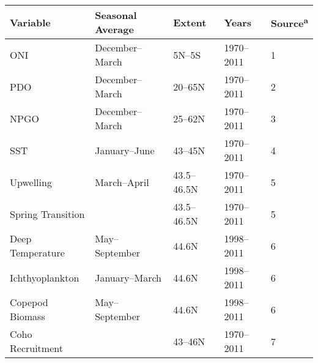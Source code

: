 \begin{tabular}{lllll}
  \hline
Variable & Seasonal Average & Extent & Years & Source\textsuperscript{a} \\ 
  \hline
ONI & December--March & 5N--5S & 1970--2011 & 1 \\ 
  PDO & December--March & 20--65N & 1970--2011 & 2 \\ 
  NPGO & December--March & 25--62N & 1970--2011 & 3 \\ 
  SST & January--June & 43--45N & 1970--2011 & 4 \\ 
  Upwelling & March--April & 43.5--46.5N & 1970--2011 & 5 \\ 
  Spring Transition &  & 43.5--46.5N & 1970--2011 & 5 \\ 
  Deep Temperature & May--September & 44.6N & 1998--2011 & 6 \\ 
  Ichthyoplankton & January--March & 44.6N & 1998--2011 & 6 \\ 
  Copepod Biomass & May--September & 44.6N & 1998--2011 & 6 \\ 
  Coho Recruitment &  & 43--46N & 1970--2011 & 7 \\ 
   \hline
\end{tabular}
